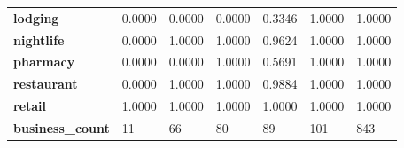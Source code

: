\documentclass{article}
\begin{document}
\begin{table}[H]
\begin{center}
\begin{tabular}{lllllll}
\textbf{lodging}                             & 0.0000        & 0.0000           & 0.0000          & 0.3346        & 1.0000           & 1.0000       \\
\textbf{nightlife}       & 0.0000        & 1.0000           & 1.0000          & 0.9624        & 1.0000           & 1.0000        \\
\textbf{pharmacy}        & 0.0000        & 0.0000           & 1.0000          & 0.5691        & 1.0000           & 1.0000        \\
\textbf{restaurant}      & 0.0000        & 1.0000           & 1.0000          & 0.9884        & 1.0000           & 1.0000        \\
\textbf{retail}          & 1.0000        & 1.0000           & 1.0000          & 1.0000        & 1.0000           & 1.0000        \\
\textbf{business\_count} & 11            & 66               & 80              & 89            & 101              & 843           
\end{tabular}
\end{center}
\end{table}
\end{document}
